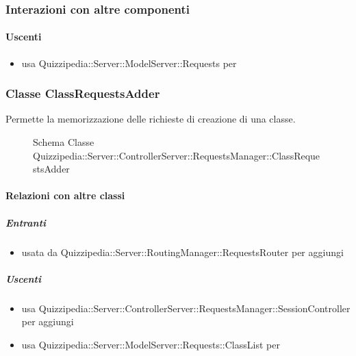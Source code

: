 \subsubsection{Interazioni con altre componenti}
\paragraph{Uscenti}
\begin{itemize}
\item usa Quizzipedia::Server::ModelServer::Requests per 
\end{itemize}
\subsubsection{Classe ClassRequestsAdder}
Permette la memorizzazione delle richieste di creazione di una classe.
\begin{figure}[H]
\centering
\noindent{}
\caption[Schema Classe ClassRequestsAdder]{Schema Classe Quizzipedia::Server::ControllerServer::RequestsManager::ClassRequestsAdder}
\end{figure}
\paragraph{Relazioni con altre classi}
\subparagraph{Entranti}
\begin{itemize}
\item usata da Quizzipedia::Server::RoutingManager::RequestsRouter per aggiungi
\end{itemize}
\subparagraph{Uscenti}
\begin{itemize}
\item usa Quizzipedia::Server::ControllerServer::RequestsManager::SessionController per aggiungi
\item usa Quizzipedia::Server::ModelServer::Requests::ClassList per 
\end{itemize}
